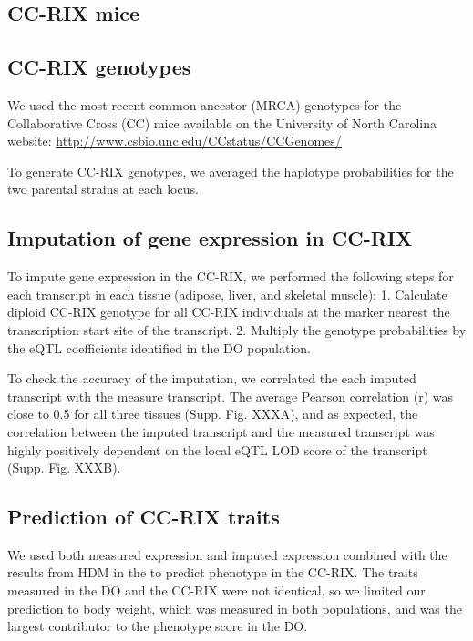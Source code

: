 \documentclass[
]{article}
\begin{document}
\subsection{CC-RIX mice}\label{cc-rix-mice}

\subsection{CC-RIX genotypes}\label{cc-rix-genotypes}

We used the most recent common ancestor (MRCA) genotypes for the
Collaborative Cross (CC) mice available on the University of North
Carolina website: \url{http://www.csbio.unc.edu/CCstatus/CCGenomes/}

To generate CC-RIX genotypes, we averaged the haplotype probabilities
for the two parental strains at each locus.

\subsection{Imputation of gene expression in
CC-RIX}\label{imputation-of-gene-expression-in-cc-rix}

To impute gene expression in the CC-RIX, we performed the following
steps for each transcript in each tissue (adipose, liver, and skeletal
muscle): 1. Calculate diploid CC-RIX genotype for all CC-RIX individuals
at the marker nearest the transcription start site of the transcript. 2.
Multiply the genotype probabilities by the eQTL coefficients identified
in the DO population.

To check the accuracy of the imputation, we correlated the each imputed
transcript with the measure transcript. The average Pearson correlation
(r) was close to 0.5 for all three tissues (Supp. Fig. XXXA), and as
expected, the correlation between the imputed transcript and the
measured transcript was highly positively dependent on the local eQTL
LOD score of the transcript (Supp. Fig. XXXB).

\subsection{Prediction of CC-RIX
traits}\label{prediction-of-cc-rix-traits}

We used both measured expression and imputed expression combined with
the results from HDM in the to predict phenotype in the CC-RIX. The
traits measured in the DO and the CC-RIX were not identical, so we
limited our prediction to body weight, which was measured in both
populations, and was the largest contributor to the phenotype score in
the DO.
\end{document}
